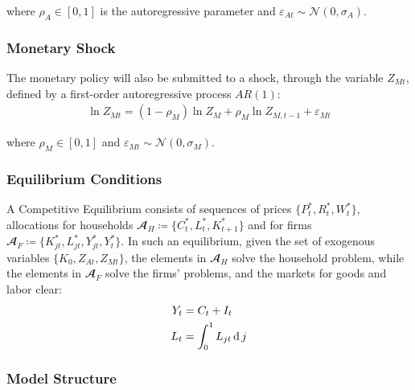 \documentclass[
thesis.tex
]{subfiles}
\begin{document}
	where $\rho_A \in [0,1]$ is the autoregressive parameter and $\varepsilon_{At} \sim \mathscr{N}(0,\sigma_A)$.
	
	\subsubsection*{Monetary Shock} \label{sec:monetary shock}
	
	The monetary policy will also be submitted to a shock, through the variable $Z_{Mt}$, defined by a first-order autoregressive process $AR(1)$:
	\begin{align}
		\ln{Z_{Mt}} = (1-\rho_M)\ln{Z_{M}} + \rho_M\ln{Z_{M,t-1}} + \varepsilon_{Mt} \label{eq:monetary-shock}
	\end{align}
	
	where $\rho_M \in [0,1]$ and $\varepsilon_{Mt} \sim \mathscr{N}(0,\sigma_M)$.
	
	
	\subsubsection{Equilibrium Conditions}
	
	
	A Competitive Equilibrium consists of sequences of prices $\{P_t^\ast, R_t^\ast, W_t^\ast\}$, allocations for households $\mathbfscr{A}_H \coloneq \{C_t^\ast, L_t^\ast, K_{t+1}^\ast\}$ and for firms $\mathbfscr{A}_F \coloneq \{K_{jt}^\ast, L_{jt}^\ast, Y_{jt}^\ast, Y_t^\ast\}$. In such an equilibrium, given the set of exogenous variables $\{K_0, Z_{At}, Z_{Mt}\}$, the elements in $\mathbfscr{A}_H$ solve the household problem, while the elements in $\mathbfscr{A}_F$ solve the firms' problems, and the markets for goods and labor clear:
	\begin{align}
		Y_t &= C_t + I_t \label{eq:market-clearing-condition} \\
		L_t &= \int_{0}^{1} L_{jt} \operatorname{d} j \label{eq:market-clearing-condition-2}
	\end{align}
	
	
	
	\subsubsection{Model Structure}
	
\end{document}
